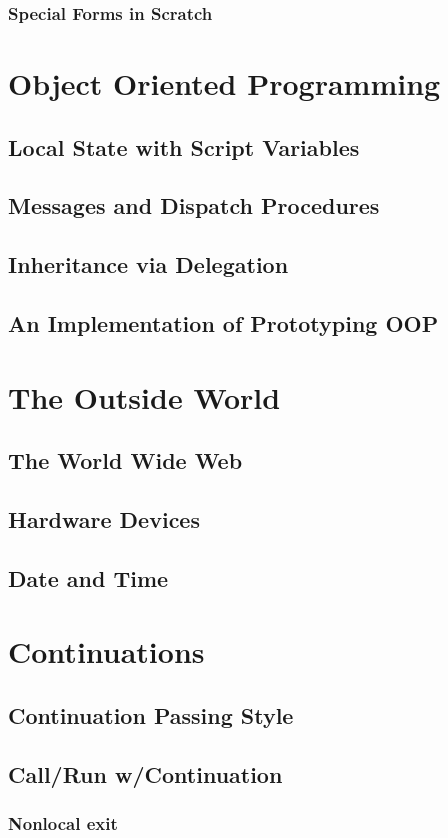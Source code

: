 \documentclass[a4paper]{report}
\begin{document}
\subsection{Special Forms in Scratch}
\chapter{Object Oriented Programming}
\section{Local State with Script Variables}
\section{Messages and Dispatch Procedures}
\section{Inheritance via Delegation}
\section{An Implementation of Prototyping OOP}
\chapter{The Outside World}
\section{The World Wide Web}
\section{Hardware Devices}
\section{Date and Time}
\chapter{Continuations}
\section{Continuation Passing Style}
\section{Call/Run w/Continuation}
\subsection{Nonlocal exit}
\end{document}
